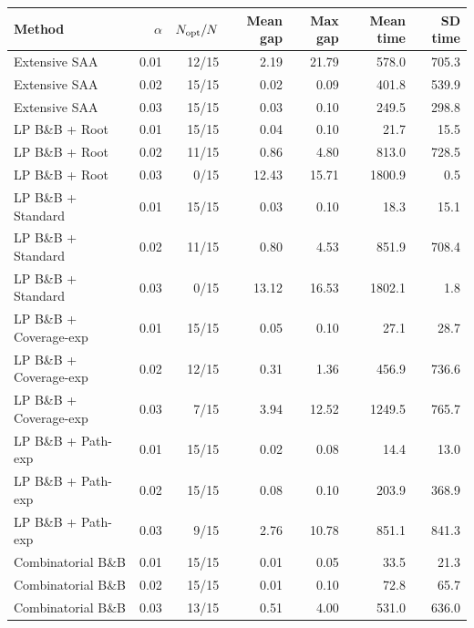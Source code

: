 \begin{tabular}{lrrrrrr}
\toprule
Method & $\alpha$ & $N_{\rm opt}/N$ & Mean gap & Max gap & Mean time & SD time \\
\midrule
Extensive SAA & 0.01 & 12/15 & 2.19 & 21.79 & 578.0 & 705.3 \\
Extensive SAA & 0.02 & 15/15 & 0.02 & 0.09 & 401.8 & 539.9 \\
Extensive SAA & 0.03 & 15/15 & 0.03 & 0.10 & 249.5 & 298.8 \\
\addlinespace
LP B\&B + Root & 0.01 & 15/15 & 0.04 & 0.10 & 21.7 & 15.5 \\
LP B\&B + Root & 0.02 & 11/15 & 0.86 & 4.80 & 813.0 & 728.5 \\
LP B\&B + Root & 0.03 & 0/15 & 12.43 & 15.71 & 1800.9 & 0.5 \\
\addlinespace
LP B\&B + Standard & 0.01 & 15/15 & 0.03 & 0.10 & 18.3 & 15.1 \\
LP B\&B + Standard & 0.02 & 11/15 & 0.80 & 4.53 & 851.9 & 708.4 \\
LP B\&B + Standard & 0.03 & 0/15 & 13.12 & 16.53 & 1802.1 & 1.8 \\
\addlinespace
LP B\&B + Coverage-exp & 0.01 & 15/15 & 0.05 & 0.10 & 27.1 & 28.7 \\
LP B\&B + Coverage-exp & 0.02 & 12/15 & 0.31 & 1.36 & 456.9 & 736.6 \\
LP B\&B + Coverage-exp & 0.03 & 7/15 & 3.94 & 12.52 & 1249.5 & 765.7 \\
\addlinespace
LP B\&B + Path-exp & 0.01 & 15/15 & 0.02 & 0.08 & 14.4 & 13.0 \\
LP B\&B + Path-exp & 0.02 & 15/15 & 0.08 & 0.10 & 203.9 & 368.9 \\
LP B\&B + Path-exp & 0.03 & 9/15 & 2.76 & 10.78 & 851.1 & 841.3 \\
\addlinespace
Combinatorial B\&B & 0.01 & 15/15 & 0.01 & 0.05 & 33.5 & 21.3 \\
Combinatorial B\&B & 0.02 & 15/15 & 0.01 & 0.10 & 72.8 & 65.7 \\
Combinatorial B\&B & 0.03 & 13/15 & 0.51 & 4.00 & 531.0 & 636.0 \\
\bottomrule
\end{tabular}
